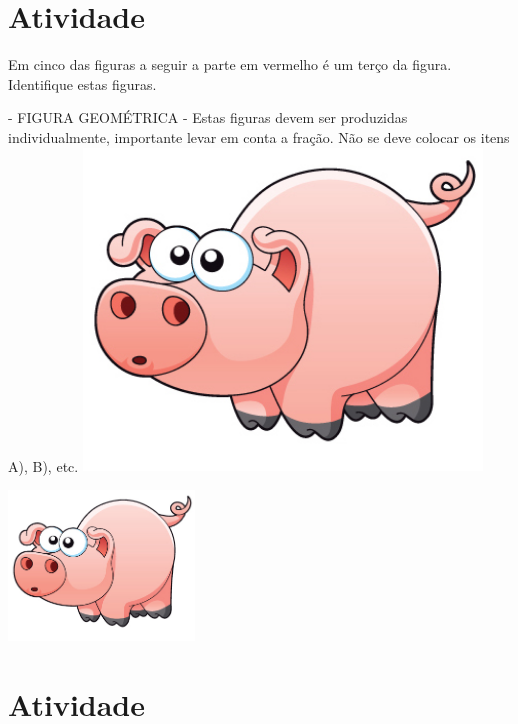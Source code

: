 \documentclass[a4,12pt]{book}
\begin{document}
\section{Atividade}








Em cinco das figuras a seguir a parte em vermelho é um terço da figura. Identifique estas figuras.
\begin{imagem*}[breakable]{}{}   - FIGURA GEOMÉTRICA - Estas figuras devem ser produzidas individualmente, importante levar em conta a fração. Não se deve colocar os itens A), B), etc.
    \includegraphics[width=300pt, keepaspectratio]{pig}
\end{imagem*}







\includegraphics[width=\textwidth,height=4cm, keepaspectratio]{pig}
\section{Atividade}
\end{document}
